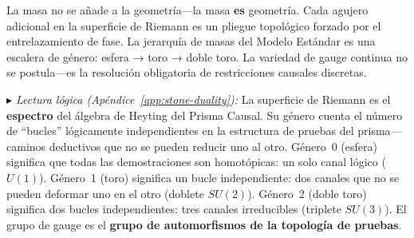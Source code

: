 \documentclass[11pt, a4paper, openany]{book}
\newcommand{\stoneref}[1]{%
  \smallskip\noindent
  {\small\color{structure!70}\textit{$\blacktriangleright$ Lectura
  l\'ogica (Ap\'endice~\ref{app:stone-duality}):} #1}%
  \smallskip}
\begin{document}
\begin{result}[title={La masa ES geometría}]
La masa no se añade a la geometría---la masa \textbf{es} geometría.
Cada agujero adicional en la superficie de Riemann es un pliegue
topológico forzado por el entrelazamiento de fase. La jerarquía de
masas del Modelo Estándar es una escalera de género:
esfera → toro → doble toro. La variedad de gauge continua no se
postula---es la resolución obligatoria de restricciones causales
discretas.
\end{result}

\stoneref{La superficie de Riemann es el \textbf{espectro} del
álgebra de Heyting del Prisma Causal. Su género cuenta el número de
``bucles'' lógicamente independientes en la estructura de pruebas
del prisma---caminos deductivos que no se pueden reducir uno al
otro. Género~0 (esfera) significa que todas las demostraciones son
homotópicas: un solo canal lógico ($U(1)$). Género~1 (toro) significa
un bucle independiente: dos canales que no se pueden deformar uno en
el otro (doblete $SU(2)$). Género~2 (doble toro) significa dos bucles
independientes: tres canales irreducibles (triplete $SU(3)$). El grupo
de gauge es el \textbf{grupo de automorfismos de la topología de
pruebas}.}
\end{document}
